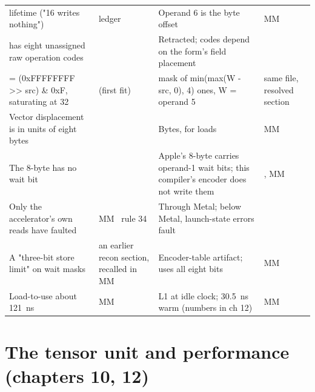\begin{xltabular}{\linewidth}{@{}>{\hsize}X>{\hsize}X>{\hsize}X>{\hsize}X@{}}
lifetime ("16 writes nothing") & ledger  & Operand 6 is the byte offset & MM~ \\
 has eight unassigned raw
operation codes &  & Retracted; codes depend on the form's field placement &  \\
 = (0xFFFFFFFF
>{}> src) \& 0xF, saturating at 32 &  (first fit) & mask of min(max(W - src, 0), 4) ones, W = operand 5 & same file, resolved section \\
Vector displacement is in units of eight bytes &  & Bytes, for loads & MM~ \\
The 8-byte  has no wait bit &  & Apple's 8-byte  carries operand-1 wait bits;
this compiler's encoder does not write them & , MM~ \\
Only the accelerator's own reads have faulted & MM~ rule 34 & Through Metal; below Metal, launch-state errors fault &  \\
A "three-bit store limit" on wait masks & an earlier recon section, recalled in MM~ & Encoder-table artifact;  uses all eight
bits & MM~ \\
Load-to-use about 121~ns & MM~ & L1 at idle clock; 30.5~ns warm (numbers in ch 12) & MM~ \\
\bottomrule
\end{xltabular}

\section{The tensor unit and performance (chapters 10, 12)}\label{sec:tensor-unit-performance-2}

